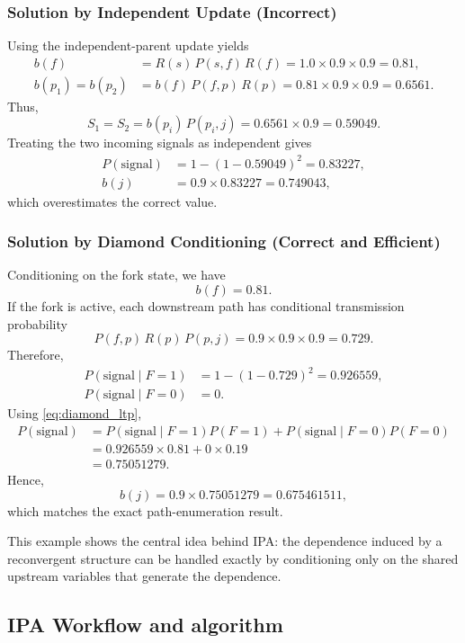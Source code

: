 \documentclass[preprint,12pt]{elsarticle}
\begin{document}
\subsubsection{Solution by Independent Update (Incorrect)}

Using the independent-parent update yields
\begin{align*}
b(f) &= R(s)\,P(s,f)\,R(f) = 1.0 \times 0.9 \times 0.9 = 0.81, \\
b(p_1)=b(p_2) &= b(f)\,P(f,p)\,R(p) = 0.81 \times 0.9 \times 0.9 = 0.6561.
\end{align*}
Thus,
\[
S_1 = S_2 = b(p_i)\,P(p_i,j) = 0.6561 \times 0.9 = 0.59049.
\]
Treating the two incoming signals as independent gives
\begin{align*}
P(\text{signal}) &= 1-(1-0.59049)^2 = 0.83227, \\
b(j) &= 0.9 \times 0.83227 = 0.749043,
\end{align*}
which overestimates the correct value.

\subsubsection{Solution by Diamond Conditioning (Correct and Efficient)}

Conditioning on the fork state, we have
\[
b(f)=0.81.
\]
If the fork is active, each downstream path has conditional transmission probability
\[
P(f,p)\,R(p)\,P(p,j)=0.9 \times 0.9 \times 0.9 = 0.729.
\]
Therefore,
\begin{align*}
P(\text{signal}\mid F=1) &= 1-(1-0.729)^2 = 0.926559, \\
P(\text{signal}\mid F=0) &= 0.
\end{align*}
Using \eqref{eq:diamond_ltp},
\begin{align*}
P(\text{signal})
&= P(\text{signal}\mid F=1)P(F=1) + P(\text{signal}\mid F=0)P(F=0) \\
&= 0.926559 \times 0.81 + 0 \times 0.19 \\
&= 0.75051279.
\end{align*}
Hence,
\[
b(j)=0.9 \times 0.75051279 = 0.675461511,
\]
which matches the exact path-enumeration result.

This example shows the central idea behind IPA: the dependence induced by a reconvergent structure can be handled exactly by conditioning only on the shared upstream variables that generate the dependence.

\subsection{IPA Workflow and algorithm}
\end{document}
